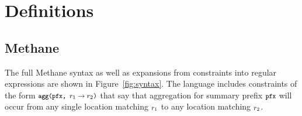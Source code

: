 \documentclass[twocolumn]{sig-alternate-10pt}
\newcommand{\sysname}{{\small \sf Methane}\xspace}
\newcommand{\CD}[1]{\texttt{\small #1}}  %
\newcommand{\KW}[1]{\texttt{\small\bfseries{#1}}}
\newcommand{\Agg}{\KW{agg}}
\begin{document}
\setlength{\pdfpageheight}{\paperheight}
\setlength{\pdfpagewidth}{\paperwidth}

\appendix

\onecolumn
\section{Definitions}

\subsection{Methane}

The full \sysname syntax as well as expansions from constraints into regular expressions are shown in Figure~\ref{fig:syntax}. The language includes constraints of the form $\CD{\Agg(pfx, \ensuremath{r_1 \rightarrow r_2})}$ that say that aggregation for summary prefix $\CD{pfx}$ will occur from any single location matching $\CD{\ensuremath{r_1}}$ to any location matching $\CD{\ensuremath{r_2}}$.
\end{document}
